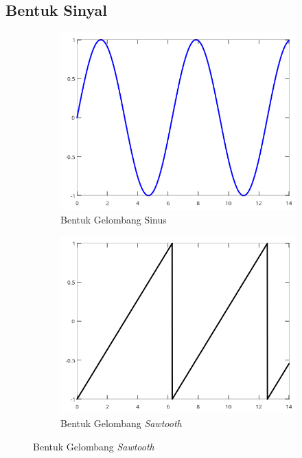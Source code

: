 \subsection{Bentuk Sinyal} \label{BentukSinyal}
\begin{figure}
	\begin{center}
		\begin{subfigure}[b]{0.3\linewidth}
			\includegraphics[width=\linewidth]{pics/bab2/gelsine.png}
			\caption[Gelombang Sinus]{Bentuk Gelombang Sinus}
		\end{subfigure}
		\begin{subfigure}[b]{0.3\linewidth}
			\includegraphics[width=\linewidth]{pics/bab2/gelsawtooth.png}
			\caption[Gelombang \textit{Sawtooth}]{Bentuk Gelombang \textit{Sawtooth}}

\end{subfigure}
\end{center}
\end{figure}
